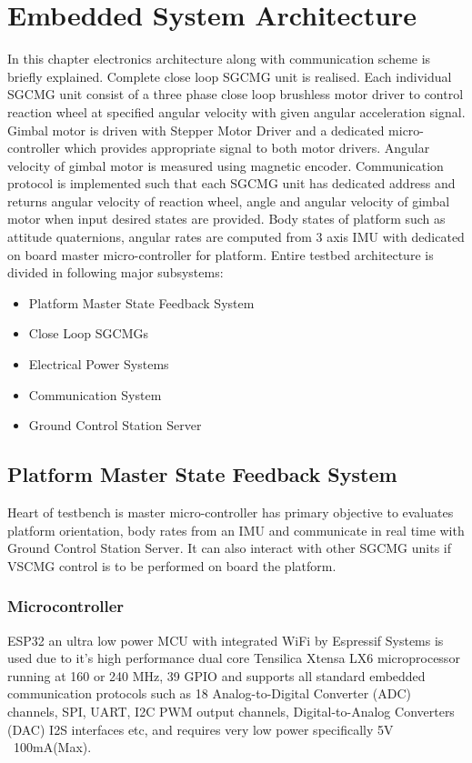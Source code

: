 \chapter{Embedded System Architecture}
\label{chap:8}
In this chapter electronics architecture along with communication scheme is briefly explained. Complete close loop SGCMG unit is realised. Each individual SGCMG unit consist of a three phase close loop brushless motor driver to control reaction wheel at specified angular velocity with given angular acceleration signal. Gimbal motor is driven with Stepper Motor Driver and a dedicated micro-controller which provides appropriate signal to both motor drivers. Angular velocity of gimbal motor is measured using magnetic encoder. Communication protocol is implemented such that each SGCMG unit has dedicated address and returns angular velocity of reaction wheel, angle and angular velocity of gimbal motor when input desired states are provided. Body states of platform such as attitude quaternions, angular rates are computed from 3 axis IMU with dedicated on board master micro-controller for platform. Entire testbed architecture is divided in following major subsystems:
\begin{itemize}
    \item Platform Master State Feedback System
    \item Close Loop SGCMGs
    \item Electrical Power Systems
    \item Communication System
    \item Ground Control Station Server
\end{itemize}
\section{Platform Master State Feedback System}
Heart of testbench is master micro-controller has primary objective to evaluates platform orientation, body rates from an IMU and communicate in real time with Ground Control Station Server. It can also interact with other SGCMG units if VSCMG control is to be performed on board the platform.
\subsection{Microcontroller}
ESP32 an ultra low power MCU with integrated WiFi by Espressif Systems is used due to it's high performance dual core Tensilica Xtensa LX6 microprocessor running at 160 or 240 MHz, 39 GPIO and supports all standard embedded communication protocols such as 18 Analog-to-Digital Converter (ADC) channels, SPI, UART, I2C PWM output channels, Digital-to-Analog Converters (DAC) I2S interfaces etc, and requires very low power specifically 5V ~100mA(Max). \cite{web:ds_esp32}

